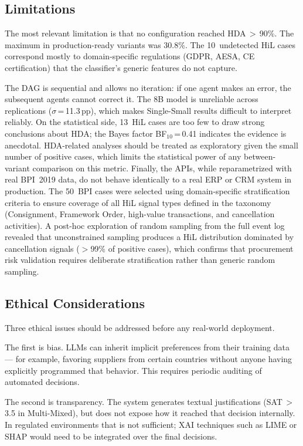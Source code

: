 \documentclass[preprint,12pt,numrefs]{elsarticle}
\begin{document}
\subsection{Limitations}
\label{sec:limitations}

The most relevant limitation is that no configuration reached
HDA\,$>$\,90\%. The maximum in production-ready variants was 30.8\%.
The 10~undetected HiL cases correspond mostly to domain-specific
regulations (GDPR, AESA, CE certification) that the classifier's
generic features do not capture.

The DAG is sequential and allows no iteration: if one agent makes an
error, the subsequent agents cannot correct it. The 8B model is
unreliable across replications ($\sigma$\,=\,11.3\,pp), which makes
Single-Small results difficult to interpret reliably. On the
statistical side, 13~HiL cases are too few to draw strong conclusions
about HDA; the Bayes factor BF$_{10}$\,=\,0.41 indicates the evidence
is anecdotal. HDA-related analyses should be treated as exploratory
given the small number of positive cases, which limits the statistical
power of any between-variant comparison on this metric. Finally, the
APIs, while reparametrized with real BPI~2019 data, do not behave
identically to a real ERP or CRM system in production.
The 50~BPI cases were selected using domain-specific stratification
criteria to ensure coverage of all HiL signal types defined in the
taxonomy (Consignment, Framework Order, high-value transactions, and
cancellation activities). A post-hoc exploration of random sampling
from the full event log revealed that unconstrained sampling produces
a HiL distribution dominated by cancellation signals ($>$99\% of
positive cases), which confirms that procurement risk validation
requires deliberate stratification rather than generic random sampling.

\subsection{Ethical Considerations}

Three ethical issues should be addressed before any real-world
deployment.

The first is bias. LLMs can inherit implicit preferences from their
training data --- for example, favoring suppliers from certain countries
without anyone having explicitly programmed that behavior. This requires
periodic auditing of automated decisions.

The second is transparency. The system generates textual justifications
(SAT\,$>$\,3.5 in Multi-Mixed), but does not expose how it reached that
decision internally. In regulated environments that is not sufficient;
XAI techniques such as LIME or SHAP would need to be integrated over
the final decisions.
\end{document}
